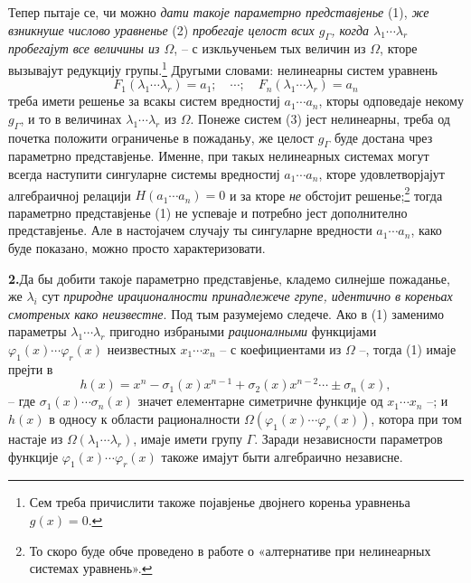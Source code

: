 ﻿\documentclass[11pt]{article}
\begin{document}
Тепер пытаје се, чи можно {\itshape дати такоје параметрно представјенье} (1), {\itshape же взникнуше числово уравненье} (2) {\itshape пробегаје целост всих $g_\Gamma$, когда $\lambda_1\cdots\lambda_r$ пробегајут все величины из $\Omega$}, -- с изкльученьем тых величин из $\Omega$, кторе вызывајут редукцију групы.\footnote{Сем треба причислити такоже појавјенье двојнего кореньа уравненьа $g(x)=0$.} Другыми словами: нелинеарны систем уравнень
\begin{equation}
 F_1(\lambda_1\cdots\lambda_r)=a_1;\quad \cdots;\quad F_n(\lambda_1\cdots\lambda_r)=a_n
\tag{3}
\end{equation}
треба имети решенье за всакы систем вредностиј $a_1\cdots a_n$, кторы одповедаје некому $g_\Gamma$, и то в величинах $\lambda_1\cdots\lambda_r$ из $\Omega$. Понеже систем (3) јест нелинеарны, треба од почетка положити ограниченье в пожаданьу, же целост $g_\Gamma$ буде достана чрез параметрно представјенье. Именне, при такых нелинеарных системах могут всегда наступити сингуларне системы вредностиј $a_1\cdots a_n$, кторе удовлетворјајут алгебраичној релацији $H(a_1\cdots a_n)=0$ и за кторе {\itshape не} обстојит решенье;\footnote{То скоро буде обче проведено в работе о «алтернативе при нелинеарных системах уравнень».} тогда параметрно представјенье (1) не успеваје и потребно јест дополнително представјенье. Але в настојачем случају ты сингуларне вредности $a_1\cdots a_n$, како буде показано, можно просто характеризовати.

\noindent\textbf{2.}\quad Да бы добити такоје параметрно представјенье, кладемо силнејше пожаданье, же $\lambda_i$ сут {\itshape природне ирационалности принадлежече групе, идентично в кореньах смотреных како неизвестне}. Под тым разумејемо следече. Ако в (1) заменимо параметры $\lambda_1\cdots\lambda_r$ пригодно избраными {\itshape рационалными} функцијами $\varphi_1(x)\cdots\varphi_r(x)$ неизвестных $x_1\cdots x_n$ -- с коефициентами из $\Omega$ --, тогда (1) имаје прејти в
\begin{equation}
 h(x)=x^n-\sigma_1(x)x^{n-1}+\sigma_2(x)x^{n-2}\cdots\pm\sigma_n(x),
\tag{4}
\end{equation}
-- где $\sigma_1(x)\cdots\sigma_n(x)$ значет елементарне симетричне функције од $x_1\cdots x_n$ --; и $h(x)$ в односу к области рационалности $\Omega(\varphi_1(x)\cdots\varphi_r(x))$, котора при том настаје из $\Omega(\lambda_1\cdots\lambda_r)$, имаје имети групу $\Gamma$. Заради независности параметров функције $\varphi_1(x)\cdots\varphi_r(x)$ такоже имајут быти алгебраично независне.
\end{document}
